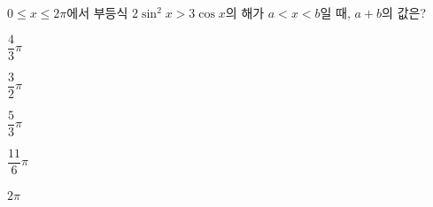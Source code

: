 $0\le x\le 2\pi$에서 부등식 $2\sin^2 x>3\cos x$의 해가 $a<x<b$일 때, $a+b$의 값은?
\begin{choices32}{\rule[-3ex]{0pt}{8ex}$\dfrac{4}{3}\pi$}{\rule[-3ex]{0pt}{8ex}$\dfrac{3}{2}\pi$}{\rule[-3ex]{0pt}{8ex}$\dfrac{5}{3}\pi$}{\rule[-3ex]{0pt}{8ex}$\dfrac{11}{6}\pi$}{\rule[-3ex]{0pt}{8ex}$2\pi$}\end{choices32}
